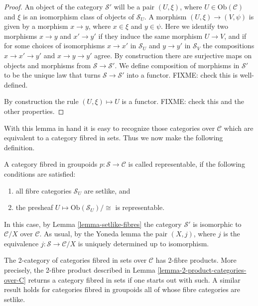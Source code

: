 \begin{proof}
An object of the category $\mathcal{S}'$ will be a pair $(U, \xi)$, where
$U \in \text{Ob}(\mathcal{C})$ and $\xi$ is an isomorphism class of objects
of $\mathcal{S}_U$. A morphism $(U,\xi) \to (V , \psi)$ is given by a 
morphism $x \to y$, where $x \in \xi$ and $y \in \psi$. Here we identify
two morphisms $x \to y$ and $x' \to y'$ if they induce the same morphism
$U \to V$, and if for some choices of isomorphisms $x \to x'$ in
$\mathcal{S}_U$ and $y \to y'$ in $\mathcal{S}_V$ the compositions
$x \to x' \to y'$ and $x \to y \to y'$ agree. By construction there are
surjective maps on objects and morphisms from $\mathcal{S} \to
\mathcal{S}'$. We define composition of morphisms in $\mathcal{S}'$ to
be the unique law that turns $\mathcal{S} \to \mathcal{S}'$ into a functor.
FIXME: check this is well-defined. 

\medskip\noindent
By construction the rule $(U,\xi) \mapsto U$ is a functor. FIXME: check this
and the other properties.
\end{proof}

\noindent
With this lemma in hand it is easy to recognize those categories over
$\mathcal{C}$ which are equivalent to a category fibred in sets. Thus we
now make the following definition.

\begin{definition}
\label{definition-representable-fibred-category}
A category fibred in groupoids $p : \mathcal{S} \to \mathcal{C}$ is
called representable, if the following conditions are satisfied:
\begin{enumerate}
\item all fibre categories $\mathcal{S}_U$ are setlike, and
\item the presheaf $U \mapsto \text{Ob}(\mathcal{S}_U)/\cong$ is 
representable.
\end{enumerate}
\end{definition}

\noindent
In this case, by Lemma \ref{lemma-setlike-fibres} the category 
$\mathcal{S}'$ is isomorphic to $\mathcal{C}/X$ over $\mathcal{C}$.
As usual, by the Yoneda lemma the pair $(X,j)$, where $j$ is the
equivalence $j : \mathcal{S} \to \mathcal{C}/X$ is uniquely determined
up to isomorphism.

\begin{lemma}
\label{lemma-2-product-categories-fibred-sets}
The 2-category of categories fibred in sets over $\mathcal{C}$
has 2-fibre products. More precisely, the 2-fibre product described in 
Lemma \ref{lemma-2-product-categories-over-C} returns a category fibred in
sets if one starts out with such. A similar result holds for categories
fibred in groupoids all of whose fibre categories are setlike.
\end{lemma}

